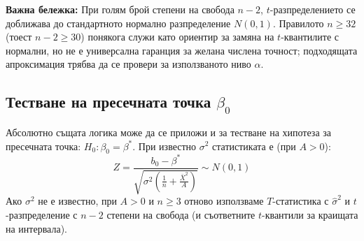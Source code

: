 \textbf{Важна бележка:} При голям брой степени на свобода $n-2$,
$t$-разпределението се доближава до стандартното нормално разпределение $N(0,1)$.
Правилото $n\geq32$ (тоест $n-2\geq30$) понякога служи като ориентир за замяна на
$t$-квантилите с нормални, но не е универсална гаранция за желана числена точност;
подходящата апроксимация трябва да се провери за използваното ниво $\alpha$.

\subsection{Тестване на пресечната точка $\beta_0$}
Абсолютно същата логика може да се приложи и за тестване на хипотеза за пресечната точка: $H_0: \beta_0 = \beta^*$.
При известно $\sigma^2$ статистиката е (при $A>0$):
\[
Z = \frac{b_0 - \beta^*}{\sqrt{\sigma^2\left(\frac{1}{n} + \frac{\bar{X}^2}{A}\right)}} \sim N(0, 1)
\]
Ако $\sigma^2$ не е известно, при $A>0$ и $n\geq 3$ отново използваме $T$-статистика с $\hat{\sigma}^2$ и $t$-разпределение с $n-2$ степени на свобода (и съответните $t$-квантили за краищата на интервала).
